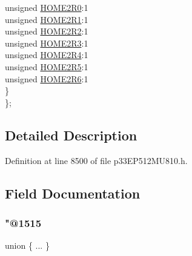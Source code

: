 \begin{DoxyCompactItemize}
\begin{tabbing}
\>\>unsigned \hyperlink{structtag_r_p_i_n_r17_b_i_t_s_a460e8fadc95c31eaa802dbc3b784e742}{HOME2R0}:1\\
\>\>unsigned \hyperlink{structtag_r_p_i_n_r17_b_i_t_s_a08c687809469e5cede7fedccdbfd3834}{HOME2R1}:1\\
\>\>unsigned \hyperlink{structtag_r_p_i_n_r17_b_i_t_s_a745a7f05d49a2ec1d0da00182267391c}{HOME2R2}:1\\
\>\>unsigned \hyperlink{structtag_r_p_i_n_r17_b_i_t_s_a18daf425f5487aee1139bf2f34d46202}{HOME2R3}:1\\
\>\>unsigned \hyperlink{structtag_r_p_i_n_r17_b_i_t_s_ac5318d1613b768f635c55bfcb19ba8b3}{HOME2R4}:1\\
\>\>unsigned \hyperlink{structtag_r_p_i_n_r17_b_i_t_s_ac64e96ffba7e4ff9bb5695f165fe6a95}{HOME2R5}:1\\
\>\>unsigned \hyperlink{structtag_r_p_i_n_r17_b_i_t_s_a7a34c56b6815b63268eb02b23c29d6c5}{HOME2R6}:1\\
\>\} \\
\}; \\

\end{tabbing}\end{DoxyCompactItemize}


\subsection{Detailed Description}


Definition at line 8500 of file p33\+E\+P512\+M\+U810.\+h.



\subsection{Field Documentation}
\mbox{\label{structtag_r_p_i_n_r17_b_i_t_s_a6a964a8091afe942d9d5ac985025539f}} 
\subsubsection{\texorpdfstring{"@1515}{@1515}}
{\footnotesize\ttfamily union \{ ... \} }

\mbox{\label{structtag_r_p_i_n_r17_b_i_t_s_adf71f3d8410c1f1dbbc96680a92c49af}} 
